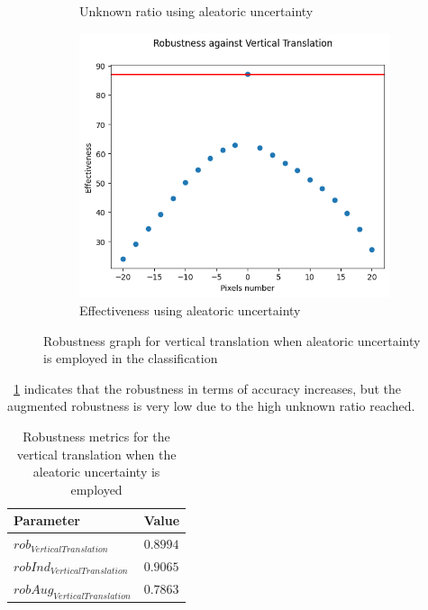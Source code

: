 \begin{figure}[h]
\begin{subfigure}{.33\textwidth}
		\caption{Unknown ratio using aleatoric uncertainty}
		\label{fig:vt_au_unkn}
	\end{subfigure}%
	\begin{subfigure}{.33\textwidth}
		\centering
		\includegraphics[width=0.9\linewidth]{ImageFiles/EvalBNN/VT/AU/eff}
		\caption{Effectiveness using aleatoric uncertainty}
		\label{fig:vt_au_eff}
	\end{subfigure}
	\caption{Robustness graph for vertical translation when aleatoric uncertainty is employed in the classification}
	\label{fig:vt_au}
\end{figure}

\Tab~\ref{table:rob_vt_au} indicates that the robustness in terms of accuracy increases, but the augmented robustness is very low due to the high unknown ratio reached.

\begin{table}[h]
	\centering
	\begin{tabular}{|| l | l ||} 
		\hline
		\textbf{Parameter} & \textbf{Value} \\
		\hline
		\hline
		$rob_{VerticalTranslation}$ & $0.8994$ \\
		$robInd_{VerticalTranslation}$ & $0.9065$ \\
		$robAug_{VerticalTranslation}$ & $0.7863$ \\	
		\hline
	\end{tabular}	
	\caption{Robustness metrics for the vertical translation when the aleatoric uncertainty is employed}
	\label{table:rob_vt_au}
\end{table}

